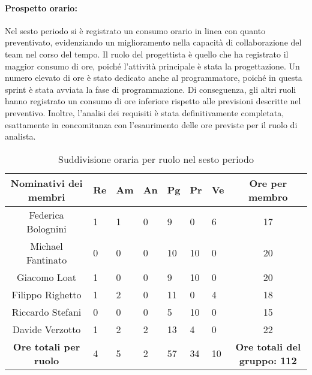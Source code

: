 \paragraph{Prospetto orario: }
Nel sesto periodo si è registrato un consumo orario in linea con quanto preventivato, evidenziando un miglioramento nella capacità di collaborazione del team nel corso del tempo. Il ruolo del progettista è quello che ha registrato il maggior consumo di ore, poiché l'attività principale è stata la progettazione. Un numero elevato di ore è stato dedicato anche al programmatore, poiché in questa sprint è stata avviata la fase di programmazione. Di conseguenza, gli altri ruoli hanno registrato un consumo di ore inferiore rispetto alle previsioni descritte nel preventivo.
Inoltre, l'analisi dei requisiti è stata definitivamente completata, esattamente in concomitanza con l'esaurimento delle ore previste per il ruolo di analista.
\begin{table}[h!]
    \centering
    \renewcommand{\arraystretch}{1.5}
    \begin{tabularx}{\textwidth}{|c|X|X|X|X|X|X|c|}\hline
    \rowcolor[HTML]{FFD700} 
    \textbf{Nominativi dei membri} & \textbf{Re} & \textbf{Am} & \textbf{An} & \textbf{Pg} & \textbf{Pr} & \textbf{Ve} & \textbf{Ore per membro} \\ \hline
    Federica Bolognini & 1 & 1 & 0 & 9 & 0 & 6 & 17  \\ \hline
    Michael Fantinato  & 0 & 0 & 0 & 10 & 10 & 0 & 20  \\ \hline
    Giacomo Loat       & 1 & 0 & 0 & 9 & 10 & 0 & 20 \\ \hline
    Filippo Righetto   & 1 & 2 & 0 & 11 & 0 & 4 & 18  \\ \hline
    Riccardo Stefani   & 0 & 0 & 0 & 5 & 10 & 0 & 15 \\ \hline
    Davide Verzotto    & 1 & 2 & 2 & 13 & 4 & 0 & 22  \\ \hline
    \rowcolor[HTML]{FFD700} 
    \textbf{Ore totali per ruolo} & 4 & 5 & 2 & 57 & 34 & 10 & \textbf{Ore totali del gruppo: 112} \\ \hline
    \end{tabularx}
    \caption{Suddivisione oraria per ruolo nel sesto periodo}
\end{table}

